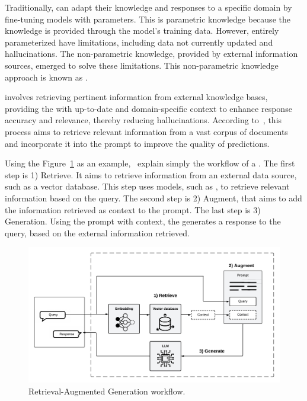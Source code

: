 Traditionally, {\llm} can adapt their knowledge and responses to a specific domain by fine-tuning models with parameters. This is parametric knowledge because the {\llm} knowledge is provided through the model's training data. However, entirely parameterized {\llm} have limitations, including data not currently updated and hallucinations. The non-parametric knowledge, provided by external information sources, emerged to solve these limitations. This non-parametric knowledge approach is known as {\rag}. 

{\rag} involves retrieving pertinent information from external knowledge bases, providing the {\llm} with up-to-date and domain-specific context to enhance response accuracy and relevance, thereby reducing hallucinations. According to~\citet{lewis_retrieval-augmented_2020}, this process aims to retrieve relevant information from a vast corpus of documents and incorporate it into the prompt to improve the quality of predictions.

Using the Figure~\ref{fig_rag} as an example,~\citet{gao_retrieval-augmented_2023} explain simply the workflow of a {\rag}. The first step is 1) Retrieve. It aims to retrieve information from an external data source, such as a vector database. This step uses {\ir} models, such as {\bm}, to retrieve relevant information based on the query. The second step is 2) Augment, that aims to add the information retrieved as context to the {\llm} prompt. The last step is 3) Generation. Using the prompt with context, the {\llm} generates a response to the query, based on the external information retrieved.


\begin{figure}[ht]
    \includegraphics[width=\textwidth]{figs/chapter2/rag_workflow.png}
    \centering
    \caption[Retrieval-Augmented Generation workflow]{Retrieval-Augmented Generation workflow.}
    \label{fig_rag}
\end{figure}


